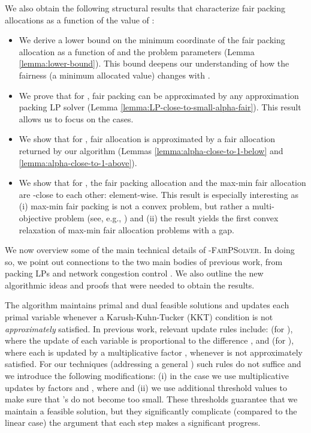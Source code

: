 \documentclass[11pt]{article}
\makeatletter
\renewcommand{\paragraph}{\@startsection{paragraph}{4}{\z@}{1ex \@plus 1ex \@minus .2ex}{-.5em}{\normalfont\normalsize\bfseries}}
\makeatother
\begin{document}
We also obtain the following structural results that characterize fair packing allocations as a function of the value of 
: 
\begin{itemize}[topsep=5pt, leftmargin=10pt]
\itemsep0em 
\item We derive a lower bound on the minimum coordinate of the fair packing allocation as a function of  and the problem parameters (Lemma \ref{lemma:lower-bound}). This bound deepens our understanding of how the fairness (a minimum allocated value) changes with . \item We prove that for , fair packing can be approximated by any approximation packing LP solver (Lemma \ref{lemma:LP-close-to-small-alpha-fair}). This result allows us to focus on the  cases.
\item We show that for , fair allocation is approximated by a fair allocation returned by our algorithm (Lemmas \ref{lemma:alpha-close-to-1-below} and \ref{lemma:alpha-close-to-1-above}).
\item We show that for , the fair packing allocation  and the max-min fair allocation  are -close to each other:  element-wise. This result is especially interesting as {(i)} max-min fair packing is not a convex problem, but rather a multi-objective problem 
(see, e.g., \cite{kleinberg1999fairness, radunovic2007unified}) {and (ii) the result yields the first convex relaxation of max-min fair allocation problems with a  gap}.
\end{itemize}

We now overview some of the main technical details of \textsc{-FairPSolver}.  In doing so, we point out connections to the two main bodies of previous work, from packing LPs\cite{AwerbuchKhandekar2009} and network congestion control \cite{kelly1998rate}. We also outline the new algorithmic ideas and proofs that were needed to obtain the results.  


\paragraph{The algorithm and KKT conditions.}
The algorithm  maintains primal and dual feasible solutions and updates each primal variable  whenever a Karush-Kuhn-Tucker (KKT) condition  is not \emph{approximately} satisfied. {In previous work, relevant update rules include}: \cite{kelly1998rate} (for ), where the update of each variable  is proportional to the difference , and \cite{AwerbuchKhandekar2009} (for ), where each  is updated by a multiplicative factor , whenever  is not {approximately} satisfied. {For our techniques (addressing a general ) such rules do not suffice and we introduce the following modifications}: (i) in the  case we use multiplicative updates by factors  and ,  where  and (ii) we use additional threshold values  to make sure that 's do not become too small.  These thresholds guarantee that we maintain a feasible solution, but they significantly complicate  (compared to the linear case) the argument that each step makes a significant progress.
\end{document}
